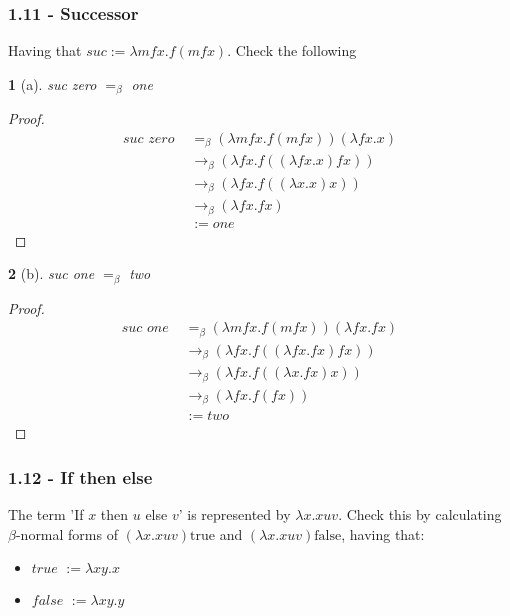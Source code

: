 \documentclass[12pt, a4paper]{article}
\newcommand{\onebeta}{\rightarrow_\beta}
\newtheorem*{exercise}{}
\begin{document}
\subsubsection{1.11 - Successor}
Having that $\textit{suc} := \lambda mfx. f(mfx)$. Check the following
\begin{exercise}[a]
    suc zero $=_\beta$ one
\end{exercise}
\begin{proof}
    \begin{subequations}
        \begin{align}
            \textit{suc zero } &=_\beta (\lambda mfx. f(mfx))(\lambda fx.x)\\
            &\onebeta (\lambda fx. f((\lambda fx.x)fx))\\
            &\onebeta (\lambda fx. f((\lambda x.x)x))\\
            &\onebeta (\lambda fx. fx)\\
            &:= one
        \end{align}
    \end{subequations}
\end{proof}

\begin{exercise}[b]
    suc one $=_\beta$ two
\end{exercise}
\begin{proof}
    \begin{subequations}
        \begin{align}
            \textit{suc one } &=_\beta (\lambda mfx. f(mfx))(\lambda fx.fx)\\
            &\onebeta (\lambda fx. f((\lambda fx.fx)fx))\\
            &\onebeta (\lambda fx. f((\lambda x.fx)x))\\
            &\onebeta (\lambda fx. f(fx))\\
            &:= two
        \end{align}
    \end{subequations}
\end{proof}

\subsubsection{1.12 - If then else}
The term 'If $x$ then $u$ else $v$' is represented by $\lambda x. xuv$. Check this by
calculating $\beta$-normal forms of $(\lambda x. xuv)\text{true}$ and $(\lambda x. xuv)\text{false}$, having that:
\begin{itemize}
    \item $\textit{true } := \lambda xy. x$
    \item $\textit{false } := \lambda xy. y$
\end{itemize}
\end{document}

